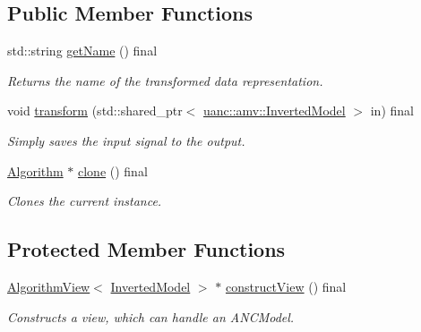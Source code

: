 \subsection*{Public Member Functions}
\begin{DoxyCompactItemize}
\item 
std\+::string \hyperlink{classuanc_1_1amv_1_1signal_1_1algorithm_1_1_identity_transformation_algorithm_ad79e871df8798749358bd3f64cd6a4f1}{get\+Name} () final
\begin{DoxyCompactList}\small\item\em Returns the name of the transformed data representation. \end{DoxyCompactList}\item 
void \hyperlink{classuanc_1_1amv_1_1signal_1_1algorithm_1_1_identity_transformation_algorithm_aac5f7f10ab44d7f8625eb5dbb72e5c44}{transform} (std\+::shared\+\_\+ptr$<$ \hyperlink{classuanc_1_1amv_1_1_inverted_model}{uanc\+::amv\+::\+Inverted\+Model} $>$ in) final
\begin{DoxyCompactList}\small\item\em Simply saves the input signal to the output. \end{DoxyCompactList}\item 
\hyperlink{classuanc_1_1amv_1_1_algorithm}{Algorithm} $\ast$ \hyperlink{classuanc_1_1amv_1_1signal_1_1algorithm_1_1_identity_transformation_algorithm_a863e785131c7e4f7d41d403a7fb4526d}{clone} () final
\begin{DoxyCompactList}\small\item\em Clones the current instance. \end{DoxyCompactList}\end{DoxyCompactItemize}
\subsection*{Protected Member Functions}
\begin{DoxyCompactItemize}
\item 
\hyperlink{classuanc_1_1amv_1_1_algorithm_view}{Algorithm\+View}$<$ \hyperlink{classuanc_1_1amv_1_1_inverted_model}{Inverted\+Model} $>$ $\ast$ \hyperlink{classuanc_1_1amv_1_1signal_1_1algorithm_1_1_identity_transformation_algorithm_a76e6380fcbcef86de4b5aa1fd7f4b77d}{construct\+View} () final
\begin{DoxyCompactList}\small\item\em Constructs a view, which can handle an A\+N\+C\+Model. \end{DoxyCompactList}\end{DoxyCompactItemize}


